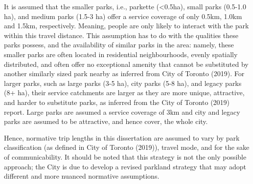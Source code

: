 \documentclass[
11pt, %
oneside, %
english, %
singlespacing, %
]{macthesis} %
\begin{document}
It is assumed that the smaller parks, i.e., parkette (\textless0.5ha), small parks (0.5-1.0 ha), and medium parks (1.5-3 ha) offer a service coverage of only 0.5km, 1.0km and 1.5km, respectively. Meaning, people are only likely to interact with the park within this travel distance. This assumption has to do with the qualities these parks possess, and the availability of similar parks in the area: namely, these smaller parks are often located in residential neighbourhoods, evenly spatially distributed, and often offer no exceptional amenity that cannot be substituted by another similarly sized park nearby as inferred from City of Toronto (2019). For larger parks, such as large parks (3-5 ha), city parks (5-8 ha), and legacy parks (8+ ha), their service catchments are larger as they are more unique, attractive, and harder to substitute parks, as inferred from the City of Toronto (2019) report. Large parks are assumed a service coverage of 3km and city and legacy parks are assumed to be attractive, and hence cover, the whole city.

Hence, normative trip lengths in this dissertation are assumed to vary by park classification (as defined in City of Toronto (2019)), travel mode, and for the sake of communicability. It should be noted that this strategy is not the only possible approach; the City is due to develop a revised parkland strategy that may adopt different and more nuanced normative assumptions.
\end{document}
